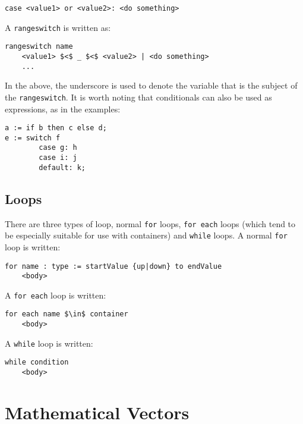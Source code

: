 \begin{lstlisting}[style=Snippet]
case <value1> or <value2>: <do something>
\end{lstlisting}
%
A \lstinline[language=Pseudocode]$rangeswitch$ is written as:
%
\begin{lstlisting}[style=Snippet]
rangeswitch name
	<value1> $<$ _ $<$ <value2> | <do something>
	...
\end{lstlisting}
%
In the above, the underscore is used to denote the variable that is the subject of the \lstinline[language=Pseudocode]$rangeswitch$. It is worth noting that conditionals can also be used as expressions, as in the examples:
%
\begin{lstlisting}[style=Snippet]
a := if b then c else d;
e := switch f
		case g: h
		case i: j
		default: k;
\end{lstlisting}

\subsection{Loops}

There are three types of loop, normal \lstinline[language=Pseudocode]$for$ loops, \lstinline[language=Pseudocode]$for each$ loops (which tend to be especially suitable for use with containers) and \lstinline[language=Pseudocode]$while$ loops. A normal \lstinline[language=Pseudocode]$for$ loop is written:
%
\begin{lstlisting}[style=Snippet]
for name : type := startValue {up|down} to endValue
	<body>
\end{lstlisting}

\noindent A \lstinline[language=Pseudocode]$for each$ loop is written:
%
\begin{lstlisting}[style=Snippet]
for each name $\in$ container
	<body>
\end{lstlisting}
%
A \lstinline[language=Pseudocode]$while$ loop is written:
%
\begin{lstlisting}[style=Snippet]
while condition
	<body>
\end{lstlisting}

\section{Mathematical Vectors}

